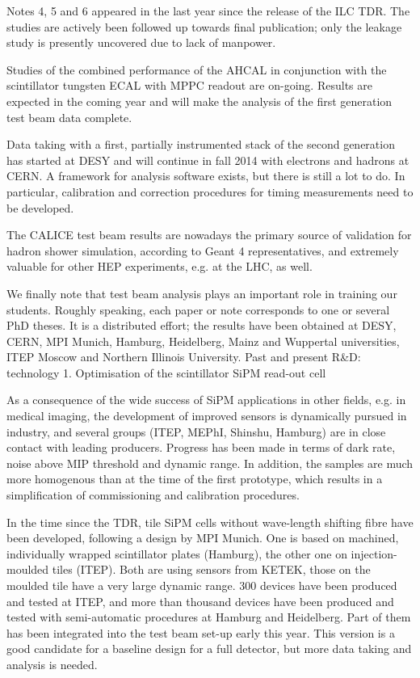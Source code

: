 Notes 4, 5 and 6 appeared in the last year since the release of the ILC TDR. The studies are actively been followed up towards final publication; only the leakage study is presently uncovered due to lack of manpower. 

Studies of the combined performance of the AHCAL in conjunction with the scintillator tungsten ECAL with MPPC readout are on-going. Results are expected in the coming year and will make the analysis of the first generation test beam data complete. 

Data taking with a first, partially instrumented stack of the second generation has started at DESY and will continue in fall 2014 with electrons and hadrons at CERN. A framework for analysis software exists, but there is still a lot to do. In particular, calibration and correction procedures for timing measurements need to be developed. 

The CALICE test beam results are nowadays the primary source of validation for hadron shower simulation, according to Geant 4 representatives, and extremely valuable for other HEP experiments, e.g. at the LHC, as well. 

We finally note that test beam analysis plays an important role in training our students. Roughly speaking, each paper or note corresponds to one or several PhD theses. It is a distributed effort; the results have been obtained at DESY, CERN, MPI Munich, Hamburg, Heidelberg, Mainz and Wuppertal universities, ITEP Moscow and Northern Illinois University.
Past and present R\&D: technology 
1.  Optimisation of the scintillator SiPM read-out cell

As a consequence of the wide success of SiPM applications in other fields, e.g. in medical imaging, the development of improved sensors is dynamically pursued in industry, and several groups (ITEP, MEPhI, Shinshu, Hamburg) are in close contact with leading producers. Progress has been made in terms of dark rate, noise above MIP threshold and dynamic range. In addition, the samples are much more homogenous than at the time of the first prototype, which results in a simplification of commissioning and calibration procedures. 

In the time since the TDR, tile SiPM cells without wave-length shifting fibre have been developed, following a design by MPI Munich. One is based on machined, individually wrapped scintillator plates (Hamburg), the other one on injection-moulded tiles (ITEP). Both are using sensors from KETEK, those on the moulded tile have a very large dynamic range. 300 devices have been produced and tested at ITEP, and more than thousand devices have been produced and tested with semi-automatic procedures at Hamburg and Heidelberg. Part of them has been integrated into the test beam set-up early this year. This version is a good candidate for a baseline design for a full detector, but more data taking and analysis is needed. 

